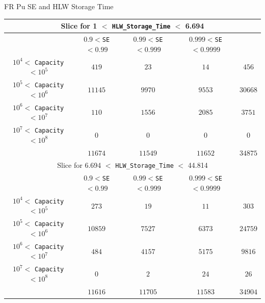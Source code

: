 \documentclass[pdf, autumn, slideColor, nocolorBG]{prosper}
\begin{document}
\begin{slide}{FR Pu SE and HLW Storage Time}
\begin{center}
\tiny
\begin{tabular}{|c||c|c|c||c|}
\hline
\multicolumn{5}{|c|}{Slice for 1 $<$ \texttt{HLW\_Storage\_Time} $<$ 6.694}\\
\hline
&$0.9<$\texttt{SE}$<0.99$&$0.99<$\texttt{SE}$<0.999$&$0.999<$\texttt{SE}$< 0.9999$&\\
\hline
$10^4 <$ \texttt{Capacity} $< 10^5$&$419$&$23$&$14$&$456$\\
\hline
$10^5 <$ \texttt{Capacity} $< 10^6$&$11145$&$9970$&$9553$&$30668$\\
\hline
$10^6 <$ \texttt{Capacity} $< 10^7$&$110$&$1556$&$2085$&$3751$\\
\hline
$10^7 <$ \texttt{Capacity} $< 10^8$&$0$&$0$&$0$&$0$\\
\hline
&$11674$&$11549$&$11652$&$34875$\\
\hline
\hline
\multicolumn{5}{|c|}{Slice for 6.694 $<$ \texttt{HLW\_Storage\_Time} $<$ 44.814}\\
\hline
&$0.9<$\texttt{SE}$<0.99$&$0.99<$\texttt{SE}$<0.999$&$0.999<$\texttt{SE}$< 0.9999$&\\
\hline
$10^4 <$ \texttt{Capacity} $< 10^5$&$273$&$19$&$11$&$303$\\
\hline
$10^5 <$ \texttt{Capacity} $< 10^6$&$10859$&$7527$&$6373$&$24759$\\
\hline
$10^6 <$ \texttt{Capacity} $< 10^7$&$484$&$4157$&$5175$&$9816$\\
\hline
$10^7 <$ \texttt{Capacity} $< 10^8$&$0$&$2$&$24$&$26$\\
\hline
&$11616$&$11705$&$11583$&$34904$\\
\hline
\end{tabular}
\end{center}
\end{slide}
\end{document}

